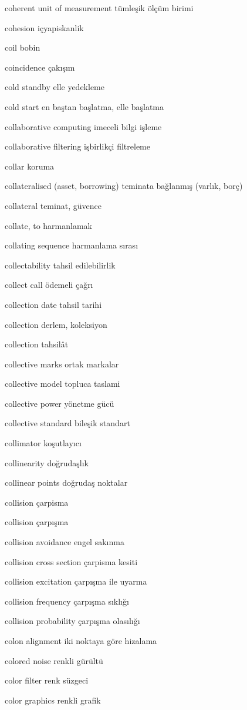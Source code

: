 \documentclass[12pt,fleqn]{article}\usepackage{../../common}
\begin{document}
coherent unit of measurement tümleşik ölçüm birimi

cohesion içyapiskanlik

coil bobin

coincidence çakışım

cold standby elle yedekleme

cold start en baştan başlatma, elle başlatma

collaborative computing imeceli bilgi işleme

collaborative filtering işbirlikçi filtreleme

collar koruma

collateralised (asset, borrowing) teminata bağlanmış (varlık, borç)

collateral teminat, güvence

collate, to harmanlamak

collating sequence harmanlama sırası

collectability tahsil edilebilirlik

collect call ödemeli çağrı

collection date tahsil tarihi

collection derlem, koleksiyon

collection tahsilât

collective marks ortak markalar

collective model topluca taslami

collective power yönetme gücü

collective standard bileşik standart

collimator koşutlayıcı

collinearity doğrudaşlık

collinear points doğrudaş noktalar

collision çarpisma

collision çarpışma

collision avoidance engel sakınma

collision cross section çarpisma kesiti

collision excitation çarpışma ile uyarma

collision frequency çarpışma sıklığı

collision probability çarpışma olasılığı

colon alignment iki noktaya göre hizalama

colored noise renkli gürültü

color filter renk süzgeci

color graphics renkli grafik
\end{document}
